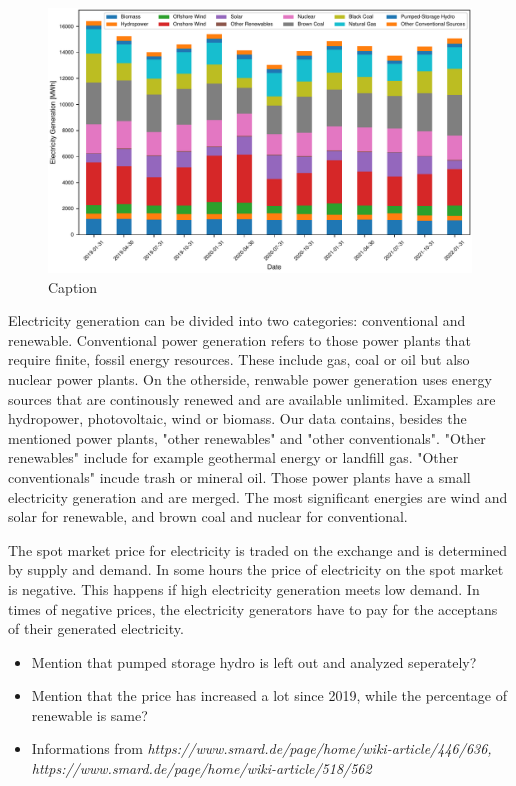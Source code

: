 \documentclass{article}
\begin{document}
\begin{figure}
    \centering
    \includegraphics[width=\columnwidth]{doc/fig/quarterly_technology_mix.pdf}
    \caption{Caption}
    \label{fig:quarterly_mix}
\end{figure}

Electricity generation can be divided into two categories: conventional and renewable. Conventional power generation refers to those power plants that require finite, fossil energy resources. These include gas, coal or oil but also nuclear power plants. On the otherside, renwable power generation uses energy sources that are continously renewed and are available unlimited. Examples are hydropower, photovoltaic, wind or biomass. Our data contains, besides the mentioned power plants, "other renewables" and "other conventionals". "Other renewables" include for example geothermal energy or landfill gas. "Other conventionals" incude trash or mineral oil. Those power plants have a small electricity generation and are merged. The most significant energies are wind and solar for renewable, and brown coal and nuclear for conventional. 

The spot market price for electricity is traded on the exchange and is determined by supply and demand. In some hours the price of electricity on the spot market is negative. This happens if high electricity generation meets low demand. In times of negative prices, the electricity generators have to pay for the acceptans of their generated electricity. 

\begin{itemize}
    \item Mention that pumped storage hydro is left out and analyzed seperately?
    \item Mention that the price has increased a lot since 2019, while the percentage of renewable is same?
    \\
    \item Informations from \textit{https://www.smard.de/page/home/wiki-article/446/636, https://www.smard.de/page/home/wiki-article/518/562}
\end{itemize}
\end{document}
